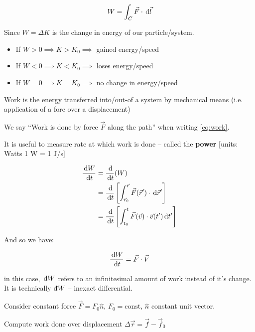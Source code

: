 \begin{equation} \label{eq:work}
	W = \int_C \vec F \cdot \D \vec l
\end{equation}

Since $W = \Delta K$ is the change in energy of our particle/system.

\begin{itemize}
	\item If $W > 0 \implies K > K_0 \implies$ gained energy/speed
	\item If $W < 0 \implies K < K_0 \implies$ loses energy/speed
	\item If $W = 0 \implies K = K_0 \implies$ no change in energy/speed
\end{itemize}

Work is the energy transferred into/out-of a system by mechanical means (i.e. application of a fore over a displacement)

We say ``Work is done by force $\vec F$ along the path'' when writing \cref*{eq:work}.

It is useful to measure rate at which work is done -- called the \textbf{power} [units: Watts 1 W = 1 J/s]

\begin{align} 
	\frac{\D W}{\D t} &= \frac{\D}{\D t}(W)\\
	&= \frac{\D}{\D t} \left[\int_{\vec r_0}^{\vec r} \vec F(\vec r') \cdot \D \vec r'\right]\\
	&= \frac{\D}{\D t} \left[\int_{t_0}^t \vec F(\vec v) \cdot \vec v(t') \D t'\right]
\end{align}

And so we have:

\begin{equation} \label{eq:power}
	\frac{\D W}{\D t} = \vec F \cdot \vec V
\end{equation}

in this case, $\D W$ refers to an infinitesimal amount of work instead of it's change. It is technically $\mathrm{d}\hspace*{-0.08em}\bar{}\hspace*{0.1em} W$ -- inexact differential.

\begin{example}
	Consider constant force $\vec F = F_0 \hat n$, $F_0 = \mathrm{const}$, $\hat n$ constant unit vector.

	Compute work done over displacement $\Delta \vec r = \vec f - \vec f_0$
\end{example}

